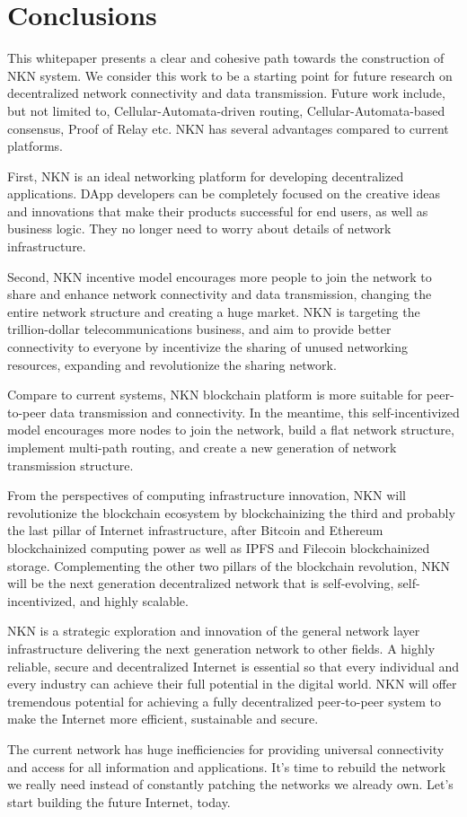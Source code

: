\documentclass[reprint,pre,aps]{revtex4-1}
\begin{document}
\section{Conclusions}

This whitepaper presents a clear and cohesive path towards the construction of NKN system. We consider this work to be a starting point for future research on decentralized network connectivity and data transmission. Future work include, but not limited to, Cellular-Automata-driven routing, Cellular-Automata-based consensus, Proof of Relay etc. NKN has several advantages compared to current platforms.

First, NKN is an ideal networking platform for developing decentralized applications. DApp developers can be completely focused on the creative ideas and innovations that make their products successful for end users, as well as business logic. They no longer need to worry about details of network infrastructure.

Second, NKN incentive model encourages more people to join the network to share and enhance network connectivity and data transmission, changing the entire network structure and creating a huge market. NKN is targeting the trillion-dollar telecommunications business, and aim to provide better connectivity to everyone by incentivize the sharing of unused networking resources, expanding and revolutionize the sharing network.

Compare to current systems, NKN blockchain platform is more suitable for peer-to-peer data transmission and connectivity. In the meantime, this self-incentivized model encourages more nodes to join the network, build a flat network structure, implement multi-path routing, and create a new generation of network transmission structure.

From the perspectives of computing infrastructure innovation, NKN will revolutionize the blockchain ecosystem by blockchainizing the third and probably the last pillar of Internet infrastructure, after Bitcoin and Ethereum blockchainized computing power as well as IPFS and Filecoin blockchainized storage. Complementing the other two pillars of the blockchain revolution, NKN will be the next generation decentralized network that is self-evolving, self-incentivized, and highly scalable. 

NKN is a strategic exploration and innovation of the general network layer infrastructure delivering the next generation network to other fields. A highly reliable, secure and decentralized Internet is essential so that every individual and every industry can achieve their full potential in the digital world. NKN will offer tremendous potential for achieving a fully decentralized peer-to-peer system to make the Internet more efficient, sustainable and secure.

The current network has huge inefficiencies for providing universal connectivity and access for all information and applications. It's time to rebuild the network we really need instead of constantly patching the networks we already own. Let's start building the future Internet, today.

\nocite{*}



\end{document}
